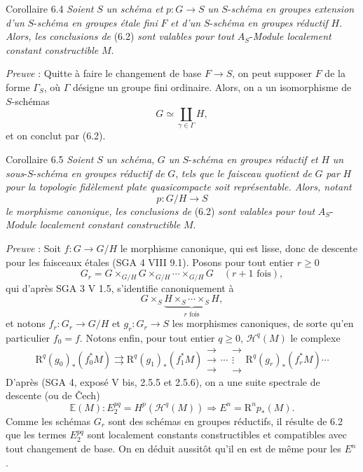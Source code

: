 \begin{statement}{Corollaire 6.4}
\emph{Soient} $S$ \emph{un schéma et} $p:G\to S$ \emph{un} $S$-\emph{schéma en groupes extension d'un} $S$-\emph{schéma en groupes étale fini} $F$ \emph{et d'un} $S$-\emph{schéma en groupes réductif} $H$. \emph{Alors, les conclusions de} (6.2) \emph{sont valables pour tout} $A_S$-\emph{Module localement constant constructible} $M$.
\end{statement}

\emph{Preuve} : Quitte à faire le changement de base $F\to S$, on peut supposer $F$ de la forme $\Gamma_S$, où $\Gamma$ désigne un groupe fini ordinaire. Alors, on a un isomorphisme de $S$-schémas
\[
G\simeq\coprod_{\gamma\in\Gamma}H,
\]
et on conclut par (6.2).

\begin{statement}{Corollaire 6.5}
\emph{Soient} $S$ \emph{un schéma}, $G$ \emph{un} $S$-\emph{schéma en groupes réductif et} $H$ \emph{un sous}-$S$-\emph{schéma en groupes réductif de} $G$, \emph{tels que le faisceau quotient de} $G$ \emph{par} $H$ \emph{pour la topologie fidèlement plate quasicompacte soit représentable. Alors, notant}
\[
p:G/H\to S
\]
\emph{le morphisme canonique, les conclusions de} (6.2) \emph{sont valables pour tout} $A_S$-\emph{Module localement constant constructible} $M$.
\end{statement}

\emph{Preuve} : Soit $f:G\to G/H$ le morphisme canonique, qui est lisse, donc de descente pour les faisceaux étales (SGA 4 VIII 9.1). Posons pour tout entier $r\ge0$
\[
G_r=G\times_{G/H}G\times_{G/H}\cdots\times_{G/H}G
\quad(r+1\text{ fois}),
\]
qui d'après SGA 3 V 1.5, s'identifie canoniquement à
\[
G\times_S\underbrace{H\times_S\cdots\times_S H}_{r\text{ fois}},
\]
et notons $f_r:G_r\to G/H$ et $g_r:G_r\to S$ les morphismes canoniques, de sorte qu'en particulier $f_0=f$. Notons enfin, pour tout entier $q\ge0$, $\mathcal{H}^q(M)$ le complexe
\[
\mathrm{R}^q(g_0)_*(f_0^*M)\rightrightarrows \mathrm{R}^q(g_1)_*(f_1^*M)\mathrel{\substack{\to\\\to\\\to}}\cdots\mathrel{\substack{\to\\\vdots\\\to}} \mathrm{R}^q(g_r)_*(f_r^*M)\cdots
\]
D'après (SGA 4, exposé V bis, 2.5.5 et 2.5.6), on a une suite spectrale de descente (ou de Čech)
\[
\mathbb{E}(M):E_2^{pq}=H^p(\mathcal{H}^q(M))\Rightarrow E^n=\mathrm{R}^np_*(M).
\]
Comme les schémas $G_r$ sont des schémas en groupes réductifs, il résulte de 6.2 que les termes $E_2^{pq}$ sont localement constants constructibles et compatibles avec tout changement de base. On en déduit aussitôt qu'il en est de même pour les $E^n$.

